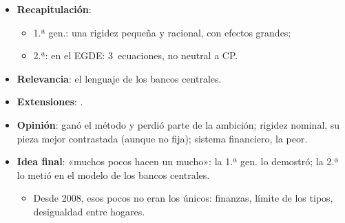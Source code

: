 \documentclass{article}
\begin{document}
\begin{columnas}
\begin{itemize}
\item \textbf{Recapitulación}:
  \begin{itemize}
  \item 1.ª gen.: una rigidez pequeña y racional, con efectos grandes;
  \item 2.ª: en el EGDE: 3~ecuaciones, no neutral a CP.
  \end{itemize}
\item \textbf{Relevancia}: el lenguaje de los bancos centrales.
\item \textbf{Extensiones}:     .
\item \textbf{Opinión}: ganó el método y perdió parte de la ambición; rigidez nominal, su pieza mejor contrastada (aunque no fija); sistema financiero, la peor.
\item \textbf{Idea final}: «muchos pocos hacen un mucho»: la 1.ª gen. lo demostró; la 2.ª lo metió en el modelo de los bancos centrales.
  \begin{itemize}
  \item Desde 2008, esos pocos no eran los únicos: finanzas, límite de los tipos, desigualdad entre hogares.
  \end{itemize}
\end{itemize}


\end{columnas}
\end{document}
